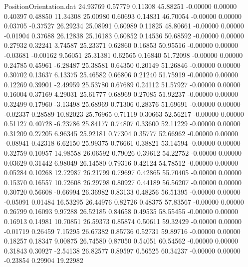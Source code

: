 \begin{filecontents}{PositionOrientation.dat}
  24.93769    0.57779    0.11308    45.88251   -0.00000    0.00000    0.40397    0.48850   11.34308
  25.00980    0.60693    0.14831    46.70054   -0.00000    0.00000    0.03705   -0.37527   26.29234
  25.08991    0.60989    0.11825    48.80661   -0.00000    0.00000   -0.01904    0.37688   26.12838
  25.16183    0.60852    0.14536    50.68592   -0.00000    0.00000    0.27932    0.32241    3.74587
  25.23371    0.62860    0.16853    50.95516   -0.00000    0.00000   -0.03681   -0.00162    9.56051
  25.31381    0.62565    0.16840    51.72098   -0.00000    0.00000    0.24785    0.45961   -6.28487
  25.38581    0.64350    0.20149    51.26846   -0.00000    0.00000    0.30702    0.13637    6.13375
  25.46582    0.66806    0.21240    51.75919   -0.00000    0.00000    0.12269    0.39901   -2.49959
  25.53780    0.67689    0.24112    51.57927   -0.00000    0.00000    0.16004    0.37169    4.29031
  25.61777    0.68969    0.27085    51.92237   -0.00000    0.00000    0.32499    0.17960   -3.13498
  25.68969    0.71306    0.28376    51.69691   -0.00000    0.00000   -0.02337    0.28589   10.82023
  25.76965    0.71119    0.30663    52.56217   -0.00000    0.00000    0.51127    0.40728   -6.23786
  25.84177    0.74807    0.33600    52.11229   -0.00000    0.00000    0.31209    0.27205    6.96345
  25.92181    0.77304    0.35777    52.66962   -0.00000    0.00000   -0.08941    0.42318    6.62150
  25.99375    0.76661    0.38821    53.14594   -0.00000    0.00000    0.32759    0.10957   14.98558
  26.06592    0.79026    0.39612    54.22752   -0.00000    0.00000    0.03629    0.31442    6.98049
  26.14580    0.79316    0.42124    54.78512   -0.00000    0.00000    0.05284    0.10268   12.72987
  26.21799    0.79697    0.42865    55.70405   -0.00000    0.00000    0.15370    0.16557   10.72608
  26.29798    0.80927    0.44189    56.56207   -0.00000    0.00000    0.30720    0.56608   -0.66994
  26.36982    0.83133    0.48256    56.51395   -0.00000    0.00000   -0.05091    0.01484   16.53295
  26.44976    0.82726    0.48375    57.83567   -0.00000    0.00000    0.26799    0.16093    9.97288
  26.52185    0.84658    0.49535    58.55455   -0.00000    0.00000    0.16913    0.14981   10.70851
  26.59373    0.85874    0.50611    59.32429   -0.00000    0.00000   -0.01719    0.26459    7.15295
  26.67382    0.85736    0.52731    59.89716   -0.00000    0.00000    0.18257    0.18347    9.00875
  26.74580    0.87050    0.54051    60.54562   -0.00000    0.00000    0.31843    0.30927   -2.54138
  26.82577    0.89597    0.56525    60.34237   -0.00000    0.00000   -0.23854    0.29904   19.22982

\end{filecontents}
